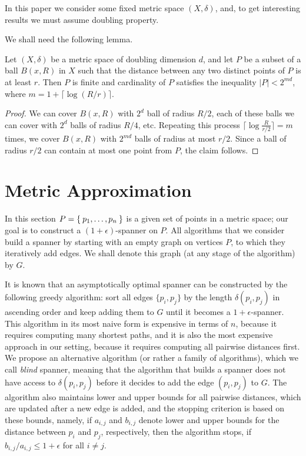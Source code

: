 \documentclass[a4paper,USenglish]{socg-lipics-v2018}
\newcommand{\eps}{\epsilon}
\newcommand{\dist}{\delta}
\begin{document}
In this paper we consider some fixed metric space $(X, \dist)$, and, to get interesting
results we must assume doubling property.

We shall need the following lemma.

\begin{lemma}
\label{lem:packing_lemma_dd}
Let $(X,\dist)$ be a metric space of doubling dimension $d$, and let $P$ be a subset of a ball $B(x,R)$ in $X$ such that the distance between any two distinct points of $P$ is at least $r$.
Then $P$ is finite and cardinality of $P$ satisfies the inequality $|P| < 2^{md}$, where $m = 1 + \lceil \log (R/r) \rceil $. 
\end{lemma}

\begin{proof}
We can cover $B(x,R)$ with $2^d$ ball of radius $R/2$, each of these balls we can cover with $2^d$
balls of radius $R/4$, etc. Repeating this process $\lceil \log \frac{R}{r/2} \rceil = m $ times, 
we cover
$B(x, R)$ with $2^{md}$ balls of radius at most $r/2$. Since a ball of radius $r/2$ can contain at most one point from $P$, the claim follows.
\end{proof}



\section{Metric Approximation}

In this section $P = \Set{p_1, \dots, p_n}$ is a given set of points in a metric space;
our goal is to construct a $(1+\eps)$-spanner on $P$. All algorithms that we consider 
build a spanner by starting with an empty graph on vertices $P$, to which they iteratively
add edges. We shall denote this graph (at any stage of the algorithm) by $G$.


It is known that an asymptotically optimal spanner can be constructed by the following greedy algorithm: 
sort all edges $\{p_i, p_j\}$ by the length $\dist(p_i, p_j)$ in ascending order and keep adding them to $G$
until it becomes a $1+\eps$-spanner. This algorithm in its most naive form is expensive in terms of $n$,
because it requires computing many shortest paths, and it is also the most expensive approach
in our setting, because it requires
 computing all pairwise distances first. We propose an alternative algorithm (or rather a family of algorithms), 
 which we call
 \textit{blind} spanner, meaning that the algorithm that builds a spanner does not have access to $\dist(p_i, p_j)$
 before it decides to add the edge $(p_i, p_j)$ to $G$.
 The algorithm also maintains lower and upper bounds
 for all pairwise distances, which are updated after a new edge is added, and the stopping criterion
 is based on these bounds, namely, if $a_{i, j}$ and $b_{i,j}$ denote lower and upper bounds
 for the distance between $p_i$ and $p_j$, respectively, then the algorithm stops, if $b_{i,j} / a_{i, j} \leq 1 + \eps$
 for all $i \neq j$.
\end{document}
